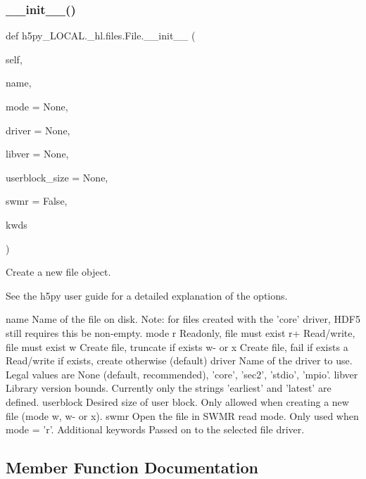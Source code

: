 \subsubsection{\texorpdfstring{\+\_\+\+\_\+init\+\_\+\+\_\+()}{\_\_init\_\_()}}
{\footnotesize\ttfamily def h5py\+\_\+\+L\+O\+C\+A\+L.\+\_\+hl.\+files.\+File.\+\_\+\+\_\+init\+\_\+\+\_\+ (\begin{DoxyParamCaption}\item[{}]{self,  }\item[{}]{name,  }\item[{}]{mode = {\ttfamily None},  }\item[{}]{driver = {\ttfamily None},  }\item[{}]{libver = {\ttfamily None},  }\item[{}]{userblock\+\_\+size = {\ttfamily None},  }\item[{}]{swmr = {\ttfamily False},  }\item[{}]{kwds }\end{DoxyParamCaption})}

\begin{DoxyVerb}Create a new file object.

See the h5py user guide for a detailed explanation of the options.

name
    Name of the file on disk.  Note: for files created with the 'core'
    driver, HDF5 still requires this be non-empty.
mode
    r        Readonly, file must exist
    r+       Read/write, file must exist
    w        Create file, truncate if exists
    w- or x  Create file, fail if exists
    a        Read/write if exists, create otherwise (default)
driver
    Name of the driver to use.  Legal values are None (default,
    recommended), 'core', 'sec2', 'stdio', 'mpio'.
libver
    Library version bounds.  Currently only the strings 'earliest'
    and 'latest' are defined.
userblock
    Desired size of user block.  Only allowed when creating a new
    file (mode w, w- or x).
swmr
    Open the file in SWMR read mode. Only used when mode = 'r'.
Additional keywords
    Passed on to the selected file driver.
\end{DoxyVerb}
 

\subsection{Member Function Documentation}
\mbox{\label{classh5py__LOCAL_1_1__hl_1_1files_1_1File_a69a7ca82af7603c2a0f1cc4ee98fc393}} 
